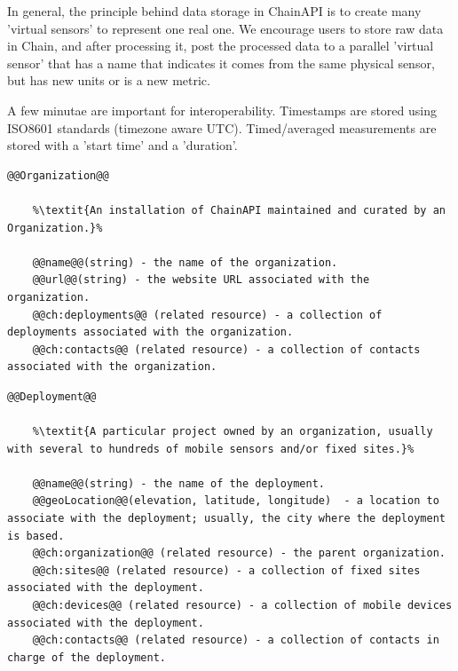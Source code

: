 In general, the principle behind data storage in ChainAPI is to create many 'virtual sensors' to represent one real one.  We encourage users to store raw data in Chain, and after processing it, post the processed data to a parallel 'virtual sensor' that has a name that indicates it comes from the same physical sensor, but has new units or is a new metric. 

A few minutae are important for interoperability.  Timestamps are stored using ISO8601 standards (timezone aware UTC).  Timed/averaged measurements are stored with a 'start time' and a 'duration'.

\begin{lstlisting}[style=codedef]
@@Organization@@
	
	%\textit{An installation of ChainAPI maintained and curated by an Organization.}%

	@@name@@(string) - the name of the organization.
	@@url@@(string) - the website URL associated with the organization.
	@@ch:deployments@@ (related resource) - a collection of deployments associated with the organization.
	@@ch:contacts@@ (related resource) - a collection of contacts associated with the organization.

\end{lstlisting}

\begin{lstlisting}[style=codedef]
@@Deployment@@
	
	%\textit{A particular project owned by an organization, usually with several to hundreds of mobile sensors and/or fixed sites.}%

	@@name@@(string) - the name of the deployment.
	@@geoLocation@@(elevation, latitude, longitude)  - a location to associate with the deployment; usually, the city where the deployment is based.
	@@ch:organization@@ (related resource) - the parent organization.
	@@ch:sites@@ (related resource) - a collection of fixed sites associated with the deployment.
	@@ch:devices@@ (related resource) - a collection of mobile devices associated with the deployment.
	@@ch:contacts@@ (related resource) - a collection of contacts in charge of the deployment.

\end{lstlisting}

